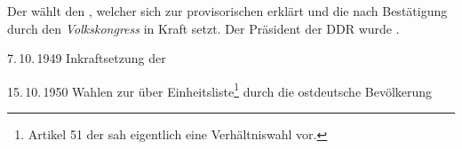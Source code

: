 \begin{chronik}
Der  wählt den , welcher sich zur provisorischen 
erklärt und die 
nach Bestätigung durch den \emph{Volkskongress} in Kraft setzt. Der
Präsident der DDR wurde .

\item[7.\,10.\,1949]
Inkraftsetzung der 

\item[15.\,10.\,1950]
Wahlen zur  über Einheitsliste\footnote{Artikel 51
der  sah
eigentlich eine Verhältniswahl vor.} durch die ostdeutsche
Bevölkerung
\end{chronik}

\endinput
